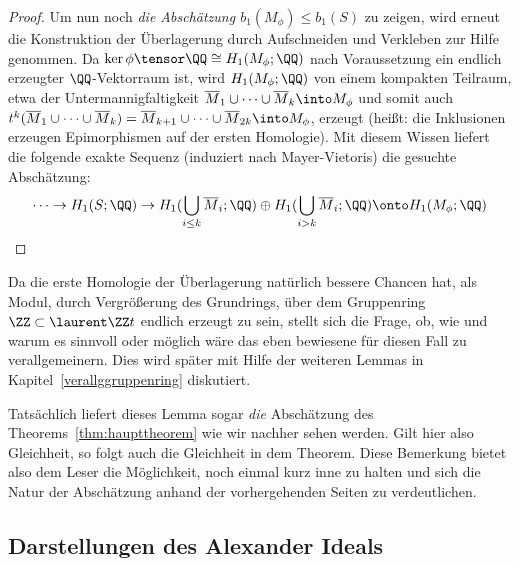 \begin{proof}
	  Um nun noch\emph{ die Abschätzung $b_1(M_\phi) \leq b_1(S)$ }zu zeigen, wird erneut die Konstruktion der Überlagerung durch Aufschneiden und Verkleben zur Hilfe genommen. Da $\ker\phi \tensor \QQ \cong H_1(M_\phi;\QQ)$ nach Voraussetzung ein endlich erzeugter $\QQ$-Vektorraum ist, wird $H_1(M_\phi;\QQ)$ von einem kompakten Teilraum, etwa der Untermannigfaltigkeit $\overline M_1 \cup \cdots \cup \overline M_k \into M_\phi$ und somit auch $t^k(\overline M_1 \cup \cdots \cup \overline M_k )  = \overline M_{k+1} \cup \cdots \cup \overline M_{2k}\into M_\phi$, erzeugt (heißt: die Inklusionen erzeugen Epimorphismen auf der ersten Homologie). Mit diesem Wissen liefert die folgende exakte Sequenz (induziert nach Mayer-Vietoris) die gesuchte Abschätzung:
	  \[
	  	\cdots \to H_1(S;\QQ) \to H_1(\bigcup_{i\leq k}\overline M_i;\QQ) \oplus H_1(\bigcup_{i>k} \overline M_i;\QQ) \onto H_1(M_\phi;\QQ)
	  \]
\end{proof}

\begin{bem}
Da die erste Homologie der Überlagerung natürlich bessere Chancen hat, als Modul, durch Vergrößerung des Grundrings, über dem Gruppenring $\ZZ\subset \laurent \ZZ t$ endlich erzeugt zu sein, stellt sich die Frage, ob, wie und warum es sinnvoll oder möglich wäre das eben bewiesene für diesen Fall zu verallgemeinern. Dies wird später mit Hilfe der weiteren Lemmas in Kapitel~\ref{verallggruppenring} diskutiert. 
\end{bem}
\begin{bem}
	Tatsächlich liefert dieses Lemma sogar \emph{die} Abschätzung des Theorems~\ref{thm:haupttheorem} wie wir nachher sehen werden. Gilt hier also Gleichheit, so folgt auch die Gleichheit in dem Theorem. Diese Bemerkung bietet also dem Leser die Möglichkeit, noch einmal kurz inne zu halten und sich die Natur der Abschätzung anhand der vorhergehenden Seiten zu verdeutlichen.
\end{bem}

\subsection{Darstellungen des Alexander Ideals}
    
